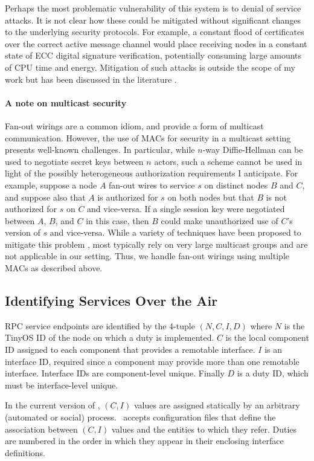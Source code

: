 Perhaps the most problematic vulnerability of this system is to denial of service attacks. It is
not clear how these could be mitigated without significant changes to the underlying security
protocols. For example, a constant flood of certificates over the correct active message channel
would place receiving nodes in a constant state of ECC digital signature verification,
potentially consuming large amounts of CPU time and energy. Mitigation of such attacks is
outside the scope of my work but has been discussed in the literature \cite{4431860}.

\paragraph{A note on multicast security} Fan-out wirings are a common idiom, and provide a form
of multicast communication. However, the use of MACs for security in a multicast setting
presents well-known challenges. In particular, while $n$-way Diffie-Hellman can be used to
negotiate secret keys between $n$ actors, such a scheme cannot be used in light of the possibly
heterogeneous authorization requirements I anticipate. For example, suppose a node $A$ fan-out
wires to service $s$ on distinct nodes $B$ and $C$, and suppose also that $A$ is authorized for
$s$ on both nodes but that $B$ is not authorized for $s$ on $C$ and vice-versa. If a single
session key were negotiated between $A$, $B$, and $C$ in this case, then $B$ could make
unauthorized use of $C$'s version of $s$ and vice-versa. While a variety of techniques have been
proposed to mitigate this problem \cite{canetti-1999}, most typically rely on very large
multicast groups and are not applicable in our setting. Thus, we handle fan-out wirings using
multiple MACs as described above.

\subsection{Identifying Services Over the Air}

RPC service endpoints are identified by the 4-tuple $(N, C, I, D)$ where $N$ is the TinyOS ID of
the node on which a duty is implemented. $C$ is the local component ID assigned to each
component that provides a remotable interface. $I$ is an interface ID, required since a
component may provide more than one remotable interface. Interface IDs are component-level
unique. Finally $D$ is a duty ID, which must be interface-level unique.

In the current version of \Sprocket, $(C, I)$ values are assigned statically by an arbitrary
(automated or social) process. \Sprocket\ accepts configuration files that define the
association between $(C, I)$ values and the entities to which they refer. Duties are numbered in
the order in which they appear in their enclosing interface definitions.


